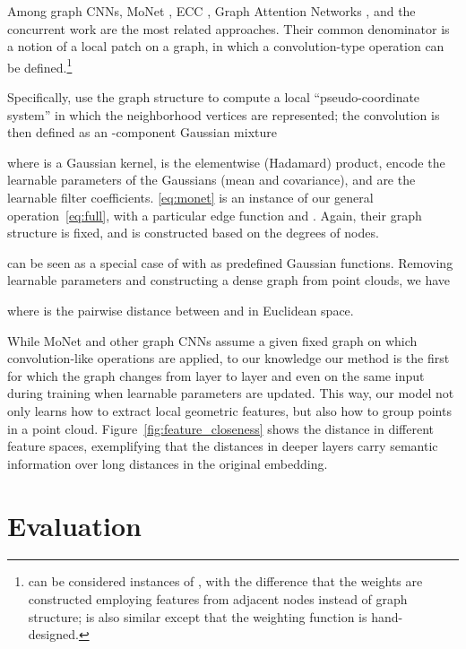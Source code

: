 \documentclass[acmtog]{acmart}
\begin{document}
Among graph CNNs, MoNet \cite{monti2016geometric}, ECC \cite{simonovsky2017ecc}, Graph Attention Networks \cite{velivckovic2017graph}, and the concurrent work \cite{pcnn2018} are the most related approaches. Their common denominator is a notion of a local patch on a graph, in which a convolution-type operation can be defined.\footnote{\cite{simonovsky2017ecc,velivckovic2017graph} can be considered instances of \cite{monti2016geometric}, with the difference that the weights are constructed employing features from adjacent nodes instead of graph structure; \cite{pcnn2018} is also similar except that the weighting function is hand-designed.}

Specifically, \citet{monti2016geometric} use the graph structure to compute a local ``pseudo-coordinate system''  in which the neighborhood vertices are represented; the convolution is then defined as an -component Gaussian mixture

where  is a Gaussian kernel,  is the elementwise (Hadamard) product,   encode the learnable parameters of the Gaussians (mean and covariance), and  are the learnable filter coefficients. 
\eqref{eq:monet} is an instance of our general operation~\eqref{eq:full}, with a particular edge function  and . Again, their graph structure is fixed, and  is constructed based on the degrees of nodes. 

\cite{pcnn2018} can be seen as a special case of \cite{monti2016geometric} with  as predefined Gaussian functions. Removing learnable parameters  and constructing a dense graph from point clouds, we have 

where  is the pairwise distance between  and  in Euclidean space. 

While MoNet and other graph CNNs assume a given fixed graph on which convolution-like operations are applied, to our knowledge our method is the first for which the graph changes from layer to layer and even on the same input during training when learnable parameters are updated. 
This way, our model not only learns how to extract local geometric features, but also how to group points in a point cloud.  Figure~\ref{fig:feature_closeness} shows the distance in different feature spaces, exemplifying that the distances in deeper layers carry semantic information over long distances in the original embedding. 

\section{Evaluation}
\end{document}
